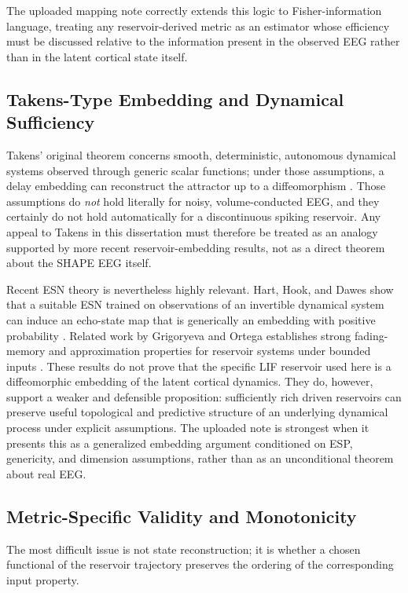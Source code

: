 The uploaded mapping note correctly extends this logic to Fisher-information language, treating any reservoir-derived metric as an estimator whose efficiency must be discussed relative to the information present in the observed EEG rather than in the latent cortical state itself.

\subsection{Takens-Type Embedding and Dynamical Sufficiency}

Takens' original theorem concerns smooth, deterministic, autonomous dynamical systems observed through generic scalar functions; under those assumptions, a delay embedding can reconstruct the attractor up to a diffeomorphism \cite{takens_detecting_1981}. Those assumptions do \emph{not} hold literally for noisy, volume-conducted EEG, and they certainly do not hold automatically for a discontinuous spiking reservoir. Any appeal to Takens in this dissertation must therefore be treated as an analogy supported by more recent reservoir-embedding results, not as a direct theorem about the SHAPE EEG itself.

Recent ESN theory is nevertheless highly relevant. Hart, Hook, and Dawes show that a suitable ESN trained on observations of an invertible dynamical system can induce an echo-state map that is generically an embedding with positive probability \cite{hart_embedding_2020}. Related work by Grigoryeva and Ortega establishes strong fading-memory and approximation properties for reservoir systems under bounded inputs \cite{grigoryeva_echo_2018}. These results do not prove that the specific LIF reservoir used here is a diffeomorphic embedding of the latent cortical dynamics. They do, however, support a weaker and defensible proposition: sufficiently rich driven reservoirs can preserve useful topological and predictive structure of an underlying dynamical process under explicit assumptions. The uploaded note is strongest when it presents this as a generalized embedding argument conditioned on ESP, genericity, and dimension assumptions, rather than as an unconditional theorem about real EEG.

\subsection{Metric-Specific Validity and Monotonicity}

The most difficult issue is not state reconstruction; it is whether a chosen functional of the reservoir trajectory preserves the ordering of the corresponding input property.

